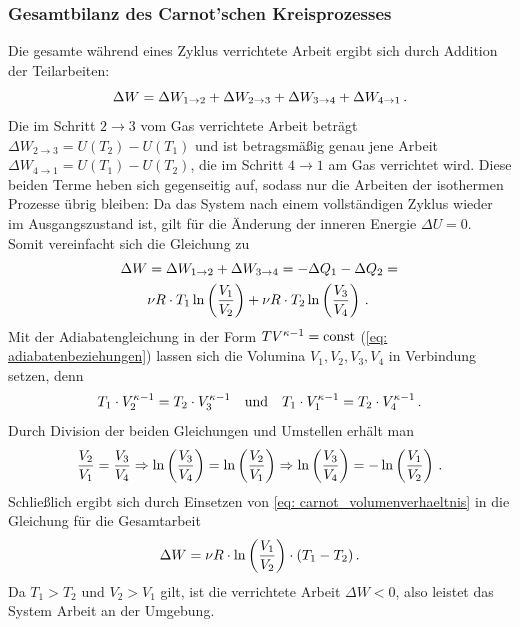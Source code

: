 \subsubsection{Gesamtbilanz des Carnot'schen Kreisprozesses}
Die gesamte während eines Zyklus verrichtete Arbeit ergibt sich durch Addition der Teilarbeiten:
\begin{equation}
    \Delta W = \Delta W_{1\to 2} + \Delta W_{2\to 3} + \Delta W_{3\to 4} + \Delta W_{4\to 1} \,.
\end{equation}
Die im Schritt $2\to 3$ vom Gas verrichtete Arbeit beträgt $\Delta W_{2\to 3} = U(T_2) - U(T_1)$ und ist betragsmäßig genau jene Arbeit $\Delta W_{4\to 1} = U(T_1) - U(T_2)$, die im Schritt $4\to 1$ am Gas verrichtet wird. Diese beiden Terme heben sich gegenseitig auf, sodass nur die Arbeiten der isothermen Prozesse übrig bleiben: 
Da das System nach einem vollständigen Zyklus wieder im Ausgangszustand ist, gilt für die Änderung der inneren Energie $\Delta U = 0$. Somit vereinfacht sich die Gleichung zu
\begin{equation}\begin{aligned}
    \Delta W &= \Delta W_{1\to 2} + \Delta W_{3\to 4} = -\Delta Q_1 - \Delta Q_2 = \\
    & \nu R \cdot T_1 \ln\left(\frac{V_1}{V_2}\right) + \nu R \cdot T_2 \ln\left(\frac{V_3}{V_4}\right) \,.
\end{aligned}\end{equation}
Mit der Adiabatengleichung in der Form $T V^{\kappa-1} = \mathrm{const}$ (\cref{eq: adiabatenbeziehungen}) lassen sich die Volumina $V_1, V_2, V_3, V_4$ in Verbindung setzen, denn
\begin{equation}
    T_1 \cdot V_2^{\kappa-1} = T_2 \cdot V_3^{\kappa-1} \quad \text{und} \quad T_1 \cdot V_1^{\kappa-1} = T_2 \cdot V_4^{\kappa-1} \,.
\end{equation}
Durch Division der beiden Gleichungen und Umstellen erhält man
\begin{equation}\label{eq: carnot_volumenverhaeltnis}
    \frac{V_2}{V_1} = \frac{V_3}{V_4} \Rightarrow \ln\left(\frac{V_3}{V_4}\right) = \ln\left(\frac{V_2}{V_1}\right) \Rightarrow \ln\left(\frac{V_3}{V_4}\right) = -\ln\left(\frac{V_1}{V_2}\right)\,.
\end{equation}
Schließlich ergibt sich durch Einsetzen von \cref{eq: carnot_volumenverhaeltnis} in die Gleichung für die Gesamtarbeit 
\begin{equation}
    \Delta W = \nu R \cdot \ln\left(\frac{V_1}{V_2}\right) \cdot (T_1 - T_2) \,.
\end{equation}
Da $T_1 > T_2$ und $V_2 > V_1$ gilt, ist die verrichtete Arbeit $\Delta W < 0$, also leistet das System Arbeit an der Umgebung.

